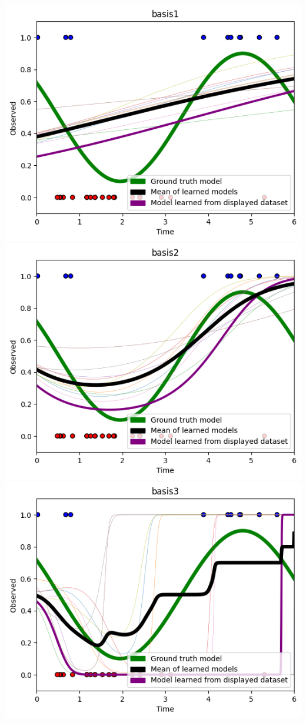 \documentclass[submit]{harvardml}
\newenvironment{ans}{
  \begin{enumerate}
  \color{blue}
}{
  \end{enumerate}
  \color{black}
}
\begin{document}
\begin{ans}
    \includegraphics[scale=0.3]{hw2/basis1.png}
    \includegraphics[scale=0.3]{hw2/basis2.png}
    \includegraphics[scale=0.3]{hw2/basis3.png}

\end{ans}
\end{document}
